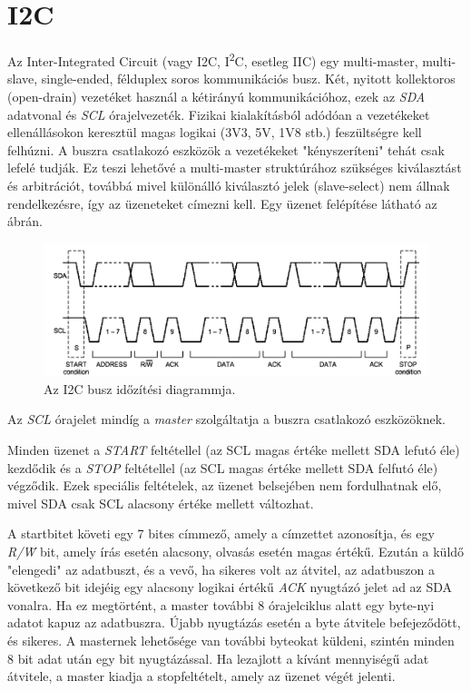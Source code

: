 \section{I2C} {
    Az Inter-Integrated Circuit (vagy I2C, I\textsuperscript{2}C, esetleg IIC) egy multi-master, multi-slave, single-ended, félduplex soros kommunikációs busz.
    Két, nyitott kollektoros (open-drain) vezetéket használ a kétirányú kommunikációhoz, ezek az \emph{SDA} adatvonal és \emph{SCL} órajelvezeték. Fizikai kialakításból adódóan a vezetékeket ellenállásokon keresztül magas logikai (3V3, 5V, 1V8 stb.) feszültségre kell felhúzni. A buszra csatlakozó eszközök a vezetékeket "kényszeríteni" tehát csak lefelé tudják. Ez teszi lehetővé a multi-master struktúrához szükséges kiválasztást és arbitrációt, továbbá mivel különálló kiválasztó jelek (slave-select) nem állnak rendelkezésre, így az üzeneteket címezni kell. Egy üzenet felépítése látható az  ábrán.

    \begin{figure}[ht!]
        \includegraphics[width = \textwidth]{figures/i2ctiming}
        \caption{Az I2C busz időzítési diagrammja.}
        \label{fig:I2Cmessage}
    \end{figure}

    Az \emph{SCL} órajelet mindíg a \emph{master} szolgáltatja a buszra csatlakozó eszközöknek.

    Minden üzenet a \emph{START} feltétellel (az SCL magas értéke mellett SDA lefutó éle) kezdődik és a \emph{STOP} feltétellel (az SCL magas értéke mellett SDA felfutó éle) végződik. Ezek speciális feltételek, az üzenet belsejében nem fordulhatnak elő, mivel SDA csak SCL alacsony értéke mellett változhat.

    A startbitet követi egy 7 bites címmező, amely a címzettet azonosítja, és egy \emph{R/\={W}} bit, amely írás esetén alacsony, olvasás esetén magas értékű. Ezután a küldő "elengedi" az adatbuszt, és a vevő, ha sikeres volt az átvitel, az adatbuszon a következő bit idejéig egy alacsony logikai értékű \emph{ACK} nyugtázó jelet ad az SDA vonalra. Ha ez megtörtént, a master további 8 órajelciklus alatt egy byte-nyi adatot kapuz az adatbuszra. Újabb nyugtázás esetén a byte átvitele befejeződött, és sikeres. A masternek lehetősége van további byteokat küldeni, szintén minden 8 bit adat után egy bit nyugtázással. Ha lezajlott a kívánt mennyiségű adat átvitele, a master kiadja a stopfeltételt, amely az üzenet végét jelenti.
}
